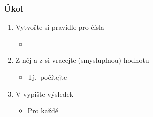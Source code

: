 \begin{frame}
  \frametitle{Úkol}

  \begin{enumerate}
    \item Vytvořte si pravidlo pro čísla
    \begin{itemize}
      \item {}
    \end{itemize}

    \item Z něj a z  si vracejte (smysluplnou) hodnotu
    \begin{itemize}
      \item Tj.\ počítejte
    \end{itemize}

    \item V  vypište výsledek
    \begin{itemize}
      \item Pro každé 
    \end{itemize}
  \end{enumerate}

\end{frame}

